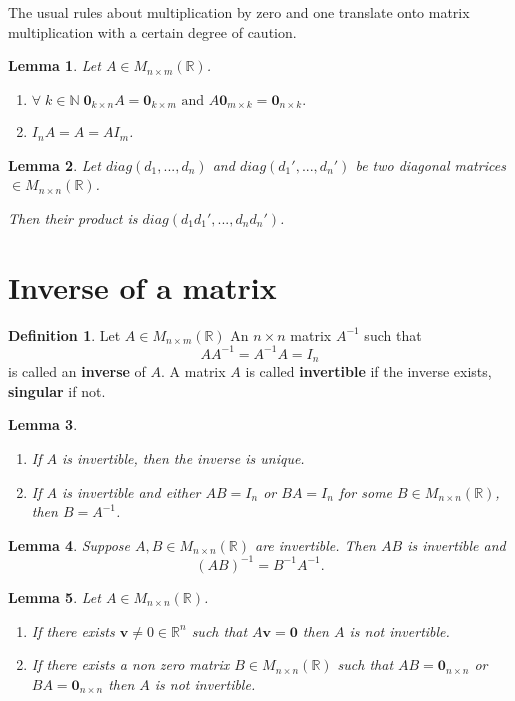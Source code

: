 \documentclass[11pt,a4paper]{article}
\newcommand\R{\mathbb{R}}
\newcommand\N{\mathbb{N}}
\newcommand\aMatrix{A \inMatrix }
\newcommand\inMatrix{\in M_{n \times m} (\R)}
\newcommand\inMatrixSq{\in M_{n \times n} (\R)}
\newtheorem{lemma}{Lemma}
\theoremstyle{definition}
\newtheorem{definition}{Definition}
\begin{document}
The usual rules about multiplication by zero and one translate onto matrix multiplication with a certain degree of caution. 

\begin{lemma}
    Let $ A \in M_{n \times m} (\R) $.
    \begin{enumerate}
        \item $ \forall \; k \in \N \; \mathbf{0}_{k \times n} A = \mathbf{0}_{k \times m} \text{ and } A\mathbf{0}_{m \times k}  = \mathbf{0}_{n \times k}. $
        \item $ I_n A = A = A I_m $.
    \end{enumerate}
\end{lemma}
\begin{lemma}
    Let $ diag(d_1, ..., d_n) $ and $ diag(d_1', ..., d_n') $ be two diagonal matrices $ \in M_{n \times n} (\R) $. 
    
    Then their product is $ diag(d_1 d_1', ..., d_n d_n') $.
\end{lemma}

\section{Inverse of a matrix}
\begin{definition}
    Let $ \aMatrix $ An $ n \times n $ matrix  $ A^{-1} $ such that 
    \[ AA^{-1} = A^{-1}A = I_n\]
    is called an \textbf{inverse} of $A$.
    A matrix $A$ is called \textbf{invertible} if the inverse exists, \textbf{singular} if not.
\end{definition}

\begin{lemma}
    \begin{enumerate}
        \item If $A$ is invertible, then the inverse is unique.
        \item If $A$ is invertible and either $AB = I_n$ or $BA = I_n$ for some $ B \inMatrixSq $, then $ B = A^{-1}$.
    \end{enumerate}
\end{lemma}

\begin{lemma}
    Suppose $ A, B \inMatrixSq $ are invertible. Then $AB$ is invertible and 
    \[ (AB)^{-1} = B^{-1}A^{-1}.\]
\end{lemma}

\begin{lemma}
    Let $ A \inMatrixSq $.
    \begin{enumerate}
        \item If there exists $ \mathbf{v} \neq 0 \in \R^n$ such that $ A\mathbf{v} = \mathbf{0}$ then $ A $ is not invertible.
        \item If there exists a non zero matrix $ B \inMatrixSq $ such that $ AB = \mathbf{0}_{n \times n} $ or  $ BA = \mathbf{0}_{n \times n} $
        then $ A $ is not invertible.
    \end{enumerate}
\end{lemma}
\end{document}
